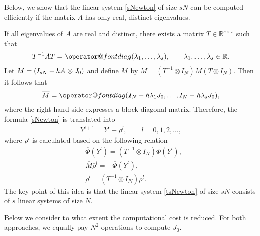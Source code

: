 \documentclass[final,leqno,onefignum,onetabnum]{siamltex1213}
\DeclarePairedDelimiter\paren{\lparen}{\rparen}
\begin{document}
Below, we show that the linear system \eqref{sNewton} of size $sN$
can be computed efficiently
if the matrix $A$ has only real, distinct eigenvalues.

If all eigenvalues of $A$ are real and distinct,
there exists a matrix $T\in\mathbb{R}^{s\times s}$ such that
\begin{align}
T^{-1} A T = {\mathop{\operator@font diag}\nolimits} (\lambda_1 , \dots, \lambda_s ), \qquad
\lambda_1,\dots,\lambda_s \in \mathbb{R}.
\end{align} 
Let $M = \paren*{I_{sN} - h A \otimes J_0 }$
and define $\overline{M}$ by $\overline{M} = (T^{-1}\otimes I_N )M (T\otimes I_N )$.
Then it follows that
\begin{align}
\overline{M} 
= {\mathop{\operator@font diag}\nolimits} ( I_N - h\lambda_1 J_0, \dots,  I_N - h\lambda_s J_0),
\end{align}
where the right hand side expresses a block diagonal matrix.
Therefore, the formula \eqref{sNewton} is translated into
\begin{align*}
Y^{l+1} = Y^l + \rho^l , \qquad l =0,1,2,\dots ,
\end{align*}
where $\rho^l$ is calculated based on the following relation
\begin{align}
& \overline{\Phi} (Y^l) = (T^{-1}\otimes I_N ) \Phi (Y^l), \label{ad1} \\
& \overline{M} \overline{\rho}^l = - \overline{\Phi} (Y^l), \label{tsNewton} \\
& \overline{\rho}^l = (T^{-1}\otimes I_N ) \rho^l. \label{ad2}
\end{align}
The key point of this idea is that
the linear system \eqref{tsNewton} of size $sN$ consists of $s$ linear systems of size $N$.

Below we consider to what extent the computational cost is reduced.
For both approaches, we equally pay $N^2$ operations to compute $J_0$.
\end{document}
